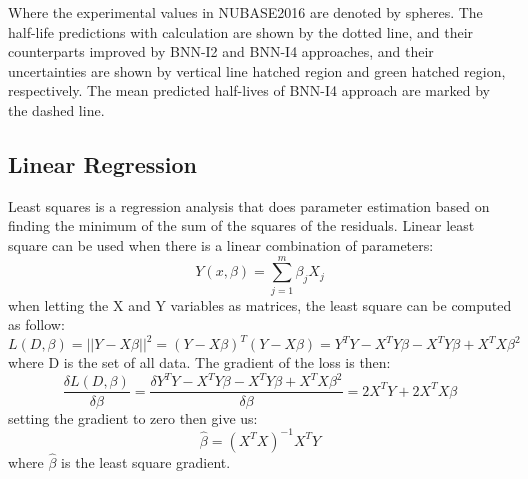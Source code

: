 Where the experimental values in NUBASE2016 are denoted by spheres. The half-life predictions with calculation are shown by the dotted line, and their counterparts improved by BNN-I2 and BNN-I4 approaches, and their uncertainties are shown by vertical line hatched region and green hatched region, respectively. The mean predicted half-lives of BNN-I4 approach are marked by the dashed line.

\subsection{Linear Regression}
Least squares is a regression analysis that does parameter estimation based on finding the minimum of the sum of the squares of the residuals. Linear least square can be used when there is a linear combination of parameters:
\begin{equation}
	Y(x,\beta)=\sum_{j=1}^{m}\beta_{j}X_{j}
\end{equation}
when letting the X and Y variables as matrices, the least square can be computed as follow:
\begin{equation}
	L(D,\beta)=||Y-X\beta||^{2}
	=(Y-X\beta)^{T}(Y-X\beta)
	=Y^{T}Y-X^{T}Y\beta -X^{T}Y\beta +X^{T}X\beta^{2}
\end{equation}
where D is the set of all data. The gradient of the loss is then:
\begin{equation}
	\frac{\delta L(D,\beta)}{\delta\beta}=
	\frac{\delta Y^{T}Y-X^{T}Y\beta -X^{T}Y\beta +X^{T}X\beta^{2}}{\delta\beta}=2X^{T}Y+2X^{T}X\beta
\end{equation}
setting the gradient to zero then give us:
\begin{equation}
	\hat{\beta}=(X^{T}X)^{-1}X^{T}Y
	\label{Eq:leastsq}
\end{equation}
where $\hat{\beta}$ is the least square gradient.